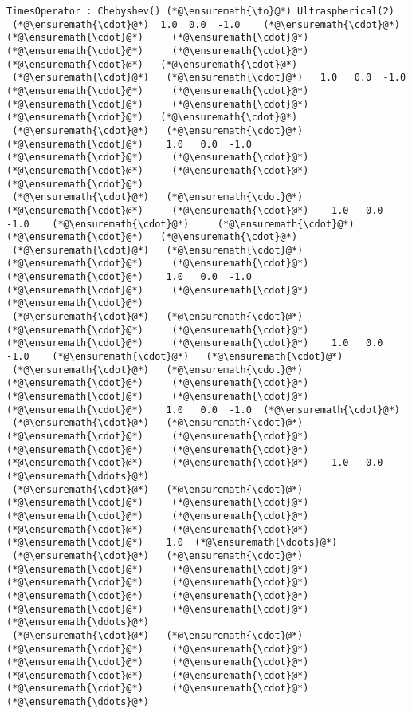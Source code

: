 \documentclass[12pt,a4paper]{article}
\begin{document}
\begin{lstlisting}
TimesOperator : Chebyshev() (*@\ensuremath{\to}@*) Ultraspherical(2)
 (*@\ensuremath{\cdot}@*)  1.0  0.0  -1.0    (*@\ensuremath{\cdot}@*)     (*@\ensuremath{\cdot}@*)     (*@\ensuremath{\cdot}@*)     (*@\ensuremath{\cdot}@*)     (*@\ensuremath{\cdot}@*)     (*@\ensuremath{\cdot}@*)   (*@\ensuremath{\cdot}@*)
 (*@\ensuremath{\cdot}@*)   (*@\ensuremath{\cdot}@*)   1.0   0.0  -1.0    (*@\ensuremath{\cdot}@*)     (*@\ensuremath{\cdot}@*)     (*@\ensuremath{\cdot}@*)     (*@\ensuremath{\cdot}@*)     (*@\ensuremath{\cdot}@*)   (*@\ensuremath{\cdot}@*)
 (*@\ensuremath{\cdot}@*)   (*@\ensuremath{\cdot}@*)    (*@\ensuremath{\cdot}@*)    1.0   0.0  -1.0    (*@\ensuremath{\cdot}@*)     (*@\ensuremath{\cdot}@*)     (*@\ensuremath{\cdot}@*)     (*@\ensuremath{\cdot}@*)   (*@\ensuremath{\cdot}@*)
 (*@\ensuremath{\cdot}@*)   (*@\ensuremath{\cdot}@*)    (*@\ensuremath{\cdot}@*)     (*@\ensuremath{\cdot}@*)    1.0   0.0  -1.0    (*@\ensuremath{\cdot}@*)     (*@\ensuremath{\cdot}@*)     (*@\ensuremath{\cdot}@*)   (*@\ensuremath{\cdot}@*)
 (*@\ensuremath{\cdot}@*)   (*@\ensuremath{\cdot}@*)    (*@\ensuremath{\cdot}@*)     (*@\ensuremath{\cdot}@*)     (*@\ensuremath{\cdot}@*)    1.0   0.0  -1.0    (*@\ensuremath{\cdot}@*)     (*@\ensuremath{\cdot}@*)   (*@\ensuremath{\cdot}@*)
 (*@\ensuremath{\cdot}@*)   (*@\ensuremath{\cdot}@*)    (*@\ensuremath{\cdot}@*)     (*@\ensuremath{\cdot}@*)     (*@\ensuremath{\cdot}@*)     (*@\ensuremath{\cdot}@*)    1.0   0.0  -1.0    (*@\ensuremath{\cdot}@*)   (*@\ensuremath{\cdot}@*)
 (*@\ensuremath{\cdot}@*)   (*@\ensuremath{\cdot}@*)    (*@\ensuremath{\cdot}@*)     (*@\ensuremath{\cdot}@*)     (*@\ensuremath{\cdot}@*)     (*@\ensuremath{\cdot}@*)     (*@\ensuremath{\cdot}@*)    1.0   0.0  -1.0  (*@\ensuremath{\cdot}@*)
 (*@\ensuremath{\cdot}@*)   (*@\ensuremath{\cdot}@*)    (*@\ensuremath{\cdot}@*)     (*@\ensuremath{\cdot}@*)     (*@\ensuremath{\cdot}@*)     (*@\ensuremath{\cdot}@*)     (*@\ensuremath{\cdot}@*)     (*@\ensuremath{\cdot}@*)    1.0   0.0  (*@\ensuremath{\ddots}@*)
 (*@\ensuremath{\cdot}@*)   (*@\ensuremath{\cdot}@*)    (*@\ensuremath{\cdot}@*)     (*@\ensuremath{\cdot}@*)     (*@\ensuremath{\cdot}@*)     (*@\ensuremath{\cdot}@*)     (*@\ensuremath{\cdot}@*)     (*@\ensuremath{\cdot}@*)     (*@\ensuremath{\cdot}@*)    1.0  (*@\ensuremath{\ddots}@*)
 (*@\ensuremath{\cdot}@*)   (*@\ensuremath{\cdot}@*)    (*@\ensuremath{\cdot}@*)     (*@\ensuremath{\cdot}@*)     (*@\ensuremath{\cdot}@*)     (*@\ensuremath{\cdot}@*)     (*@\ensuremath{\cdot}@*)     (*@\ensuremath{\cdot}@*)     (*@\ensuremath{\cdot}@*)     (*@\ensuremath{\cdot}@*)   (*@\ensuremath{\ddots}@*)
 (*@\ensuremath{\cdot}@*)   (*@\ensuremath{\cdot}@*)    (*@\ensuremath{\cdot}@*)     (*@\ensuremath{\cdot}@*)     (*@\ensuremath{\cdot}@*)     (*@\ensuremath{\cdot}@*)     (*@\ensuremath{\cdot}@*)     (*@\ensuremath{\cdot}@*)     (*@\ensuremath{\cdot}@*)     (*@\ensuremath{\cdot}@*)   (*@\ensuremath{\ddots}@*)
\end{lstlisting}
\end{document}
